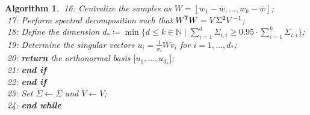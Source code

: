 \documentclass[11pt, a4paper]{article}
\newtheorem{algorithm}[theorem]{Algorithm}
\newcommand{\N}{\mathbb{N}}
\newcommand*{\tr}{^{\mkern-1.5mu\mathsf{T}}}
\begin{document}
\begin{algorithm}
\textcolor{white}{$\Big |$}16: \quad \quad \quad Centralize the samples as $W = [w_1-\overline{w}, \dots, w_k - \overline{w}]$; \\
\textcolor{white}{$\Big |$}17: \quad \quad \quad Perform spectral decomposition such that $W\tr W = V \Sigma^2 V^{-1}$;  \\
\textcolor{white}{$\Big |$}18: \quad \quad \quad Define the dimension $d_* \coloneq \min \big \{ d \leq k \in \N \mid \sum_{i=1}^{d} \Sigma_{i,i} \geq 0.95 \cdot \sum_{i=1}^{k} \Sigma_{i,i} \big \}$; \\
\textcolor{white}{$\Big |$}19: \quad \quad \quad Determine the singular vectors $u_i = \frac{1}{\sigma_i}Wv_i$ for $i=1, \dots, d_*$; \\
\textcolor{white}{$\Big |$}20: \quad \quad \quad \textbf{return} the orthonormal basis $\big [u_1, \dots, u_{d_*} \big ]$; \\
\textcolor{white}{$\Big |$}21: \quad \quad \textbf{end if} \\
\textcolor{white}{$\Big |$}22: \quad \textbf{end if} \\
\textcolor{white}{$\Big |$}23: \quad Set $\tilde{\Sigma} \leftarrow \Sigma$ and $\tilde{V} \leftarrow V$; \\
\textcolor{white}{$\Big |$}24: \textbf{end while} \\
\end{algorithm}
\end{document}
